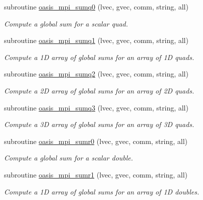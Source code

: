 \begin{DoxyCompactItemize}
subroutine \hyperlink{interfacemod__oasis__mpi_1_1oasis__mpi__sum_abffb7172c344ad2577ac229168327fcd}{oasis\+\_\+mpi\+\_\+sumq0} (lvec, gvec, comm, string, all)
\begin{DoxyCompactList}\small\item\em Compute a global sum for a scalar quad. \end{DoxyCompactList}\item 
subroutine \hyperlink{interfacemod__oasis__mpi_1_1oasis__mpi__sum_a96b845cbd75c4613df6fee8ac5c65d71}{oasis\+\_\+mpi\+\_\+sumq1} (lvec, gvec, comm, string, all)
\begin{DoxyCompactList}\small\item\em Compute a 1D array of global sums for an array of 1D quads. \end{DoxyCompactList}\item 
subroutine \hyperlink{interfacemod__oasis__mpi_1_1oasis__mpi__sum_a030add8b5e1875ca3f80319d47c687a3}{oasis\+\_\+mpi\+\_\+sumq2} (lvec, gvec, comm, string, all)
\begin{DoxyCompactList}\small\item\em Compute a 2D array of global sums for an array of 2D quads. \end{DoxyCompactList}\item 
subroutine \hyperlink{interfacemod__oasis__mpi_1_1oasis__mpi__sum_a95ded5a769c74998a3fe47b080aeb17e}{oasis\+\_\+mpi\+\_\+sumq3} (lvec, gvec, comm, string, all)
\begin{DoxyCompactList}\small\item\em Compute a 3D array of global sums for an array of 3D quads. \end{DoxyCompactList}\item 
subroutine \hyperlink{interfacemod__oasis__mpi_1_1oasis__mpi__sum_aef927bb26681ca81b005940fad26d27f}{oasis\+\_\+mpi\+\_\+sumr0} (lvec, gvec, comm, string, all)
\begin{DoxyCompactList}\small\item\em Compute a global sum for a scalar double. \end{DoxyCompactList}\item 
subroutine \hyperlink{interfacemod__oasis__mpi_1_1oasis__mpi__sum_a509c6561bf7677ca44df5727ec7af8bf}{oasis\+\_\+mpi\+\_\+sumr1} (lvec, gvec, comm, string, all)
\begin{DoxyCompactList}\small\item\em Compute a 1D array of global sums for an array of 1D doubles. \end{DoxyCompactList}\item 

\end{DoxyCompactItemize}

